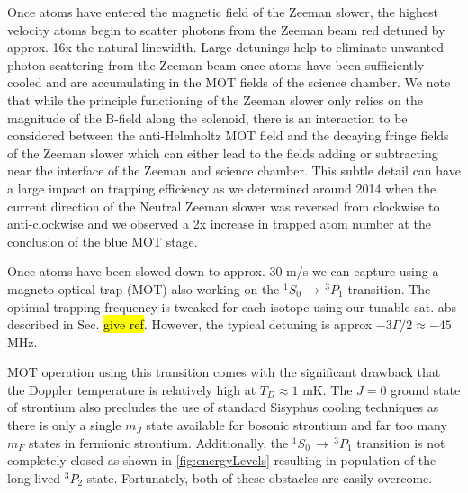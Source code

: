 Once atoms have entered the magnetic field of the Zeeman slower, the highest velocity atoms begin to scatter photons from the Zeeman beam red detuned by approx. 16x the natural linewidth.
Large detunings help to eliminate unwanted photon scattering from the Zeeman beam once atoms have been sufficiently cooled and are accumulating in the MOT fields of the science chamber.
We note that while the principle functioning of the Zeeman slower only relies on the magnitude of the B-field along the solenoid, there is an interaction to be considered between the anti-Helmholtz MOT field and the decaying fringe fields of the Zeeman slower which can either lead to the fields adding or subtracting near the interface of the Zeeman and science chamber.
This subtle detail can have a large impact on trapping efficiency as we determined around 2014 when the current direction of the Neutral Zeeman slower was reversed from clockwise to anti-clockwise and we observed a 2x increase in trapped atom number at the conclusion of the blue MOT stage.

Once atoms have been slowed down to approx. 30 m/s we can capture using a magneto-optical trap (MOT) also working on the $^1S_0\,\rightarrow\,^3P_1$ transition. 
The optimal trapping frequency is tweaked for each isotope using our tunable sat. abs described in Sec. \hl{give ref}.
However, the typical detuning is approx $-3\Gamma/2 \approx -45$ MHz. 

MOT operation using this transition comes with the significant drawback that the Doppler temperature is relatively high at $T_D\approx1$ mK. 
The $J=0$ ground state of strontium also precludes the use of standard Sisyphus cooling techniques as there is only a single $m_J$ state available for bosonic strontium and far too many $m_F$ states in fermionic strontium.
Additionally, the $^1S_0\,\rightarrow\,^3P_1$ transition is not completely closed as shown in \;\ref{fig:energyLevels} resulting in population of the long-lived $^3P_2$ state. 
Fortunately, both of these obstacles are easily overcome.

